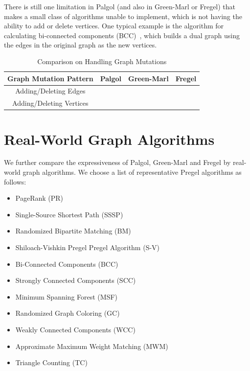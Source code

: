 \documentclass{sokendai_thesis} %
\newcommand{\cmark}{\ding{51}}%
\newcommand{\xmark}{\ding{55}}%
\begin{document}
There is still one limitation in Palgol (and also in Green-Marl or Fregel) that makes a small class of algorithms unable to implement, which is not having the ability to add or delete vertices.
One typical example is the algorithm for calculating bi-connected components (BCC)~\cite{connectivity}, which builds a dual graph using the edges in the original graph as the new vertices.

\begin{table}[t]
 \vspace{-2ex}
 \centering
 \caption{Comparison on Handling Graph Mutations}
 \label{tab:gm}
 \begin{tabular}{c|c|c|c}
  \hline
  \textbf{Graph Mutation Pattern} & Palgol & Green-Marl & Fregel \\
  \hline\hline
  Adding/Deleting Edges & \cmark & \xmark & \xmark \\
  \hline
  Adding/Deleting Vertices & \xmark & \xmark & \xmark \\
  \hline
 \end{tabular}
\vspace{-2ex}\end{table}

\section{Real-World Graph Algorithms}
\label{sec:real-algos}

We further compare the expressiveness of Palgol, Green-Marl and Fregel by real-world graph algorithms.
We choose a list of representative Pregel algorithms as follows:

\begin{itemize}
 \item PageRank (PR)~\cite{pregel}
 \item Single-Source Shortest Path (SSSP)~\cite{pregel}
 \item Randomized Bipartite Matching (BM)~\cite{pregel}
 \item Shiloach-Vishkin Pregel Pregel Algorithm (S-V)~\cite{connectivity}
 \item Bi-Connected Components (BCC)~\cite{connectivity}
 \item Strongly Connected Components (SCC)~\cite{connectivity}
 \item Minimum Spanning Forest (MSF)~\cite{optimizing}
 \item Randomized Graph Coloring (GC)~\cite{optimizing}
 \item Weakly Connected Components (WCC)~\cite{optimizing}
 \item Approximate Maximum Weight Matching (MWM)~\cite{optimizing}
 \item Triangle Counting (TC)~\cite{triangle}
\end{itemize}
\end{document}
